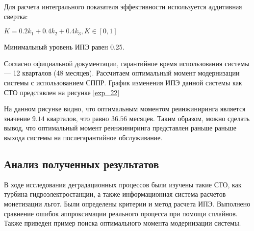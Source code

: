 Для расчета интегрального показателя эффективности используется аддитивная свертка:
\begin{center}
$K=0.2k_1+0.4k_2+0.4k_3, K \in [0,1]$
\end{center}

Минимальный уровень ИПЭ равен 0.25.

Согласно официальной документации, гарантийное время использования системы --- 12 кварталов (48 месяцев).
Рассчитаем оптимальный момент модернизации системы с использованием СППР. 
График изменения ИПЭ данной системы как СТО представлен на рисунке \ref{exp_22}

На данном рисунке видно, что оптимальным моментом реинжиниринга является значение $9.14$ кварталов, 
что равно $36.56$ месяцев. 
Таким образом, можно сделать вывод, что оптимальный момент реинжиниринга представлен раньше раньше выхода системы на послегарантийное обслуживание.

\subsection{Анализ полученных результатов}

В ходе исследования деградационных процессов были изучены такие СТО, как турбина гидроэлектростанции,
а также информационная система расчетов монетизации льгот.
Были определены критерии и метод расчета ИПЭ. 
Выполнено сравнение ошибок аппроксимации реального процесса при помощи сплайнов.
Также приведен пример поиска оптимального момента модернизации системы.




